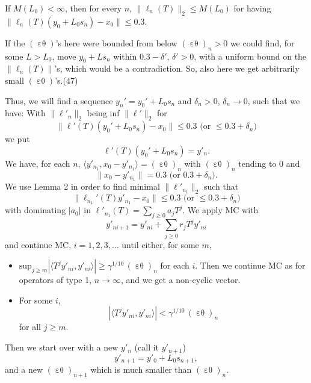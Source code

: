 \documentclass[12pt,oneside,reqno]{amsart}
\theoremstyle{definition}
\DeclareMathOperator*{\VE}{\varepsilon\theta}
\begin{document}
If $M(L_0) < \infty$, then for every $n$, $\|\ell_n(T)\|_2 \le M(L_0)$ for having $\|\ell_n(T) (y_0 + L_0 s_n) - x_0\| \le 0.3$.

If the $(\VE)$'s here were bounded from below $(\VE)_n > 0$ we could find, for some $L > L_0$, move $y_0 + L s_n$ within $0.3 - \delta'$, $\delta' > 0$, with a uniform bound on the $\| \ell_n(T)\|$'s, which would be a contradiction. So, also here we get arbitrarily small $(\VE)$'s.\hfill (47)

Thus, we will find a sequence  $y_n' = y_0' + L_0 s_n$ and $\delta_n > 0$, $\delta_n \rightarrow 0$, such that we have: With $\|\ell'_n\|_2$ being inf $\|\ell'\|_2$ for 
$$\|\ell'(T) (y_0' + L_0 s_n) - x_0\| \le 0.3 \text{  (or } \le 0.3 + \delta_n \text{)}$$
we put 
$$\ell'(T) (y_0' + L_0 s_n) = y'_n.$$
We have, for each $n$, $\langle y'_{n_1}, x_0 - y'_{n_1}\rangle = (\VE)_n$ with $(\VE)_n$ tending to $0$ and 
$$\| x_0 - y'_{n_1}\| = 0.3 \text{  (or } 0.3 + \delta_n \text{)}.$$
We use Lemma 2 in order to find minimal $\|\ell'_{n_1}\|_2$ such that 
$$\|\ell_{n_1}'(T) y'_{n_1} - x_0\| \le 0.3 \text{  (or } \le 0.3 + \delta_n \text{)}$$
with dominating $|a_0|$ in $\ell'_{n_1}(T) = \sum_{j \ge 0} a_j T^j.$ We apply MC with
$$y'_{ni+1} = y'_{n i} + \sum_{j \ge 0} r_j T^j y'_{n i}$$
and continue MC, $i= 1, 2, 3, \ldots$ until either, for some $m$,
\begin{itemize}
	\item[1.)] $\text{sup}_{j \ge m} |\langle T^j y'_{n i}, y'_{n i}\rangle | \ge \gamma^{1/10} \, (\VE)_n$ for each $i$. Then we continue MC as for operators of type 1, $n \rightarrow \infty$, and we get a non-cyclic vector.
	\item[2.)] For some $i$, 
	$$|\langle T^j y'_{n i}, y'_{n i}\rangle | < \gamma^{1/10} \, (\VE)_n$$
	for all $j \ge m$.
\end{itemize}
Then we start over with a new $y'_n$ (call it $y'_{n+1}$) 
$$y'_{n+1} = y'_0 + L_0 s_{n+1},$$
and a new $(\VE)_{n+1}$ which is much smaller than $(\VE)_n$.
\end{document}
